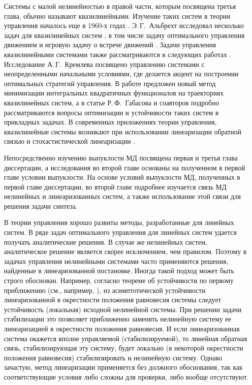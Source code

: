 \documentclass[../main.tex]{subfiles}
\begin{document}
Системы с малой нелинейностью в правой части, которым посвящена третья глава, обычно называют квазилинейными. 
Изучение таких систем в теории управления началось еще в 1960-х годах \cite{Kiselev, Kras_book, Subbotin}.
Э.\,Г.~Альбрехт исследовал несколько задач для квазилинейных систем \cite{Albrecht3}, в том числе задачу оптимального управления движением \cite{Albrecht1} и игровую задачу о встрече движений \cite{Albrecht2}.
Задачи управления квазилинейными системами также рассматриваются в следующих работах \cite{Dauer, Kremlev, KalininLavrinovich2018, Gabasov}.
Исследование А.\,Г.~Кремлева \cite{Kremlev} посвящено управлению системами с неопределенными начальными условиями, где делается акцент на построении оптимальных стратегий управления.
В работе \cite{KalininLavrinovich2018} предложен новый метод минимизации интегральных квадратичных функционалов на траекториях квазилинейных систем, а в статье Р.\,Ф.~Габасова и соавторов \cite{Gabasov} подробно рассматриваются вопросы оптимизации и устойчивости таких систем в прикладных задачах.
В современных приложениях теории управления, квазилинейные системы возникают при использовании линеаризации обратной связью и стохастистической линеаризации \cite{Ching, Gui}.

Непосредственно изучению выпуклости МД посвящена первая и третья глава диссертации, а исследования во второй главе основаны на полученном в первой главе условии выпуклости.
На основе условий выпуклости МД, полученных в первой главе диссертации, во второй главе подробнее изучается связь МД нелинейных и линеаризованных систем, а также использование этой связи для решения задачи синтеза. 

В теории управления хорошо развиты методы, разработанные для линейных систем. 
В ряде задач оптимального управления для линейных систем удается получать аналитические решения. 
В случае же нелинейных систем, аналитическое решение является скорее исключением, чем правилом. 
Поэтому в задачах управления нелинейными системами часто применяются решения, найденные в линеаризованной постановке. 
Иногда такой подход может быть строго обоснован. 
Например, согласно теореме об устойчивости по первому приближению (см., например, \cite{Barbashin_book}), из асимптотической устойчивости линеаризованной в окрестности положения равновесия системы следует устойчивость (локальная) исходной нелинейной системы. 
При решении задачи стабилизации это позволяет приближенно заменять нелинейную систему ее линеаризацией в окрестности положения равновесия. 
И если линеаризованная система окажется вполне управляемой (стабилизируемой), то линейная обратная связь, стабилизирующая эту систему, будет локально (в некоторой окрестности положения равновесия) стабилизировать и нелинейную систему\cite{Kras_add, Stab_lectures, Khalil, Polyak_book}.  
Однако зачастую, метод линеаризации применяется без должного обоснования, так как соответствующие условия либо сложны для проверки, либо вообще отсутствуют.
\end{document}
